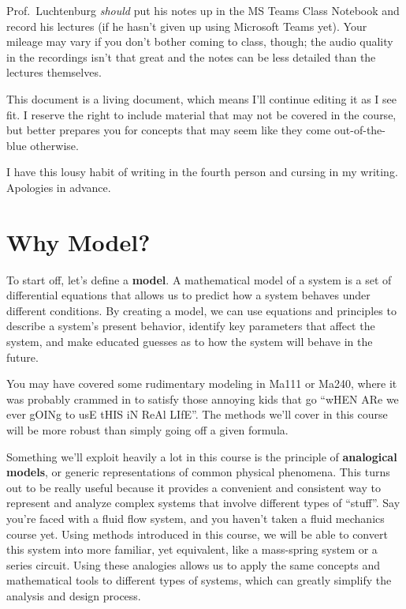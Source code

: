\documentclass[
  letterpaper,
  DIV=11,
  numbers=noendperiod]{scrreprt}
\begin{document}
Prof.~Luchtenburg \emph{should} put his notes up in the MS Teams Class
Notebook and record his lectures (if he hasn't given up using Microsoft
Teams yet). Your mileage may vary if you don't bother coming to class,
though; the audio quality in the recordings isn't that great and the
notes can be less detailed than the lectures themselves.

This document is a living document, which means I'll continue editing it
as I see fit. I reserve the right to include material that may not be
covered in the course, but better prepares you for concepts that may
seem like they come out-of-the-blue otherwise.

I have this lousy habit of writing in the fourth person and cursing in
my writing. Apologies in advance.

\hypertarget{why-model}{%
\section{Why Model?}\label{why-model}}

To start off, let's define a \textbf{model}. A mathematical model of a
system is a set of differential equations that allows us to predict how
a system behaves under different conditions. By creating a model, we can
use equations and principles to describe a system's present behavior,
identify key parameters that affect the system, and make educated
guesses as to how the system will behave in the future.

You may have covered some rudimentary modeling in Ma111 or Ma240, where
it was probably crammed in to satisfy those annoying kids that go ``wHEN
ARe we ever gOINg to usE tHIS iN ReAl LIfE''. The methods we'll cover in
this course will be more robust than simply going off a given formula.

Something we'll exploit heavily a lot in this course is the principle of
\textbf{analogical models}, or generic representations of common
physical phenomena. This turns out to be really useful because it
provides a convenient and consistent way to represent and analyze
complex systems that involve different types of ``stuff''. Say you're
faced with a fluid flow system, and you haven't taken a fluid mechanics
course yet. Using methods introduced in this course, we will be able to
convert this system into more familiar, yet equivalent, like a
mass-spring system or a series circuit. Using these analogies allows us
to apply the same concepts and mathematical tools to different types of
systems, which can greatly simplify the analysis and design process.
\end{document}
